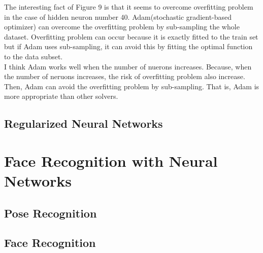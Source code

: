 \documentclass[a4paper]{article}
\begin{document}
The interesting fact of Figure 9 is that it seems to overcome overfitting problem in the case of hidden neuron number 40. Adam(stochastic gradient-based optimizer) can overcome the overfitting problem by sub-sampling the whole dataset. Overfitting problem can occur because it is exactly fitted to the train set but if Adam uses sub-sampling, it can avoid this by fitting the optimal function to the data subset.\\
I think Adam works well when the number of nuerons increases. Because, when the number of neruons increases, the risk of overfitting problem also increase. Then, Adam can avoid the overfitting problem by sub-sampling. That is, Adam is more appropriate than other solvers.
\subsection{Regularized Neural Networks}
\section{Face Recognition with Neural Networks}
\subsection{Pose Recognition}
\subsection{Face Recognition}
\end{document}

